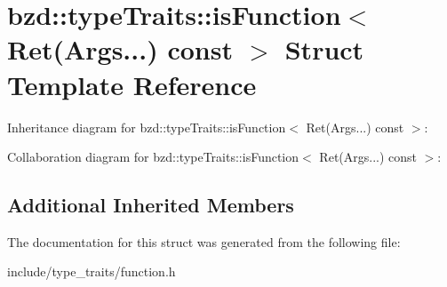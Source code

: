 \hypertarget{structbzd_1_1typeTraits_1_1isFunction_3_01Ret_07Args_8_8_8_08_01const_01_4}{}\section{bzd\+:\+:type\+Traits\+:\+:is\+Function$<$ Ret(Args...) const $>$ Struct Template Reference}
\label{structbzd_1_1typeTraits_1_1isFunction_3_01Ret_07Args_8_8_8_08_01const_01_4}


Inheritance diagram for bzd\+:\+:type\+Traits\+:\+:is\+Function$<$ Ret(Args...) const $>$\+:


Collaboration diagram for bzd\+:\+:type\+Traits\+:\+:is\+Function$<$ Ret(Args...) const $>$\+:
\subsection*{Additional Inherited Members}


The documentation for this struct was generated from the following file\+:\begin{DoxyCompactItemize}
\item 
include/type\+\_\+traits/function.\+h\end{DoxyCompactItemize}
